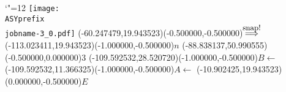 \setlength{\unitlength}{1pt}
\makeatletter%
\let\ASYencoding\f@encoding%
\let\ASYfamily\f@family%
\let\ASYseries\f@series%
\let\ASYshape\f@shape%
\makeatother%
{\catcode`"=12%
\texttt{[image: \\ASYprefix\\jobname-3\_0.pdf]}%
}%
\color{ASYcolor}
\fontsize{12.000000}{14.400000}\selectfont
\usefont{\ASYencoding}{\ASYfamily}{\ASYseries}{\ASYshape}%
\ASYalign(-60.247479,19.943523)(-0.500000,-0.500000){$\stackrel{\mbox{\small snap!}}{\Longrightarrow}$}%
\color{ASYcolor}
\fontsize{12.000000}{14.400000}\selectfont
\ASYalign(-113.023411,19.943523)(-1.000000,-0.500000){$n$}%
\color{ASYcolor}
\fontsize{12.000000}{14.400000}\selectfont
\ASYalign(-88.838137,50.990555)(-0.500000,0.000000){$3$}%
\color{ASYcolor}
\fontsize{12.000000}{14.400000}\selectfont
\ASYalign(-109.592532,28.520720)(-1.000000,-0.500000){$B \leftarrow$}%
\color{ASYcolor}
\fontsize{12.000000}{14.400000}\selectfont
\ASYalign(-109.592532,11.366325)(-1.000000,-0.500000){$A \leftarrow$}%
\color{ASYcolor}
\fontsize{12.000000}{14.400000}\selectfont
\ASYalign(-10.902425,19.943523)(0.000000,-0.500000){$E$}%
